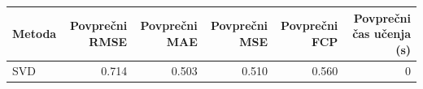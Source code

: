 \begin{tabular}{lrrrrr}
\toprule
Metoda & Povprečni RMSE & Povprečni MAE & Povprečni MSE & Povprečni FCP & Povprečni čas učenja (s) \\
\midrule
SVD & 0.714 & 0.503 & 0.510 & 0.560 & 0 \\
\bottomrule
\end{tabular}
